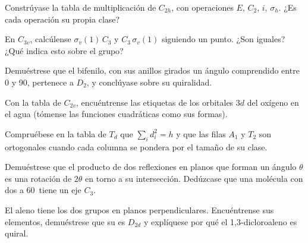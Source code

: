\begin{exercise}[$\star\star$]\label{exo:b3:point-groups:5}
Constrúyase la tabla de multiplicación de $C_{2h}$, con operaciones $E$, $C_2$, $i$,
$\sigma_h$. ¿Es cada operación su propia clase?
\end{exercise}

\begin{exercise}[$\star\star$]\label{exo:b3:point-groups:6}
En $C_{3v}$, calcúlense $\sigma_v(1)\,C_3$ y $C_3\,\sigma_v(1)$ siguiendo un punto.
¿Son iguales? ¿Qué indica esto sobre el grupo?
\end{exercise}

\begin{exercise}[$\star\star$]\label{exo:b3:point-groups:7}
Demuéstrese que el bifenilo, con sus anillos girados un ángulo comprendido entre 0 y 90\textdegree,
pertenece a $D_2$, y conclúyase sobre su quiralidad.
\end{exercise}

\begin{exercise}[$\star\star$]\label{exo:b3:point-groups:8}
Con la tabla de $C_{2v}$, encuéntrense las etiquetas de los orbitales $3d$ del oxígeno en el agua
(tómense las funciones cuadráticas como sus formas).
\end{exercise}

\begin{exercise}[$\star\star$]\label{exo:b3:point-groups:9}
Compruébese en la tabla de $T_d$ que $\sum_id_i^2 = h$ y que las filas $A_1$ y $T_2$
son ortogonales cuando cada columna se pondera por el tamaño de su clase.
\end{exercise}

\begin{exercise}[$\star\star\star$]\label{exo:b3:point-groups:10}
Demuéstrese que el producto de dos reflexiones en planos que forman un ángulo
$\theta$ es una rotación de $2\theta$ en torno a su intersección. Dedúzcase que una
molécula con dos  a 60\textdegree\ tiene un eje $C_3$.
\end{exercise}

\begin{exercise}[$\star\star\star$]\label{exo:b3:point-groups:11}
El aleno  tiene los dos grupos  en planos perpendiculares. Encuéntrense
sus elementos, demuéstrese que su  es $D_{2d}$ y explíquese por qué
el 1,3-dicloroaleno  es quiral.
\end{exercise}

